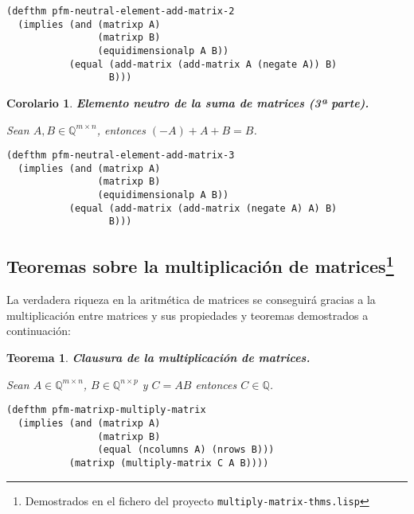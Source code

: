 \documentclass[a4paper,10pt]{article}
\newcommand{\Q}[1]{#1 \in \mathbb{Q}}
\newcommand{\M}[3]{#1 \in \mathbb{Q}^{#2 \times #3}}
\newtheorem{teor}{{Teorema}}
\newtheorem{coro}{{Corolario}}
\begin{document}
\begin{lstlisting}[language=clips]
(defthm pfm-neutral-element-add-matrix-2
  (implies (and (matrixp A)
                (matrixp B)
                (equidimensionalp A B))
           (equal (add-matrix (add-matrix A (negate A)) B)
                  B)))
\end{lstlisting}	

\par \vspace{16pt}

\begin{coro} \textbf{Elemento neutro de la suma de matrices (3ª parte).}\vspace{8pt}\par
Sean $\M{A,B}{m}{n}$, entonces $(-A) + A + B = B$.
\end{coro}

\begin{lstlisting}[language=clips]
(defthm pfm-neutral-element-add-matrix-3
  (implies (and (matrixp A)
                (matrixp B)
                (equidimensionalp A B))
           (equal (add-matrix (add-matrix (negate A) A) B)
                  B)))
\end{lstlisting}	

\vspace{12pt}
\subsection[Teoremas sobre la multiplicación de matrices]{Teoremas sobre la multiplicación de matrices\footnote{Demostrados en el fichero del proyecto \texttt{multiply-matrix-thms.lisp}}}
\vspace{10pt}

La verdadera riqueza en la aritmética de matrices se conseguirá gracias a la multiplicación entre matrices y sus propiedades y teoremas demostrados a continuación:

\par \vspace{16pt}

\begin{teor} \textbf{Clausura de la multiplicación de matrices.}\vspace{8pt}\par
Sean $\M{A}{m}{n}$, $\M{B}{n}{p}$ y $C = AB$ entonces $\Q{C}$.
\end{teor}

\begin{lstlisting}[language=clips]
(defthm pfm-matrixp-multiply-matrix
  (implies (and (matrixp A)
                (matrixp B)
                (equal (ncolumns A) (nrows B)))
           (matrixp (multiply-matrix C A B))))
\end{lstlisting}	
\end{document}
